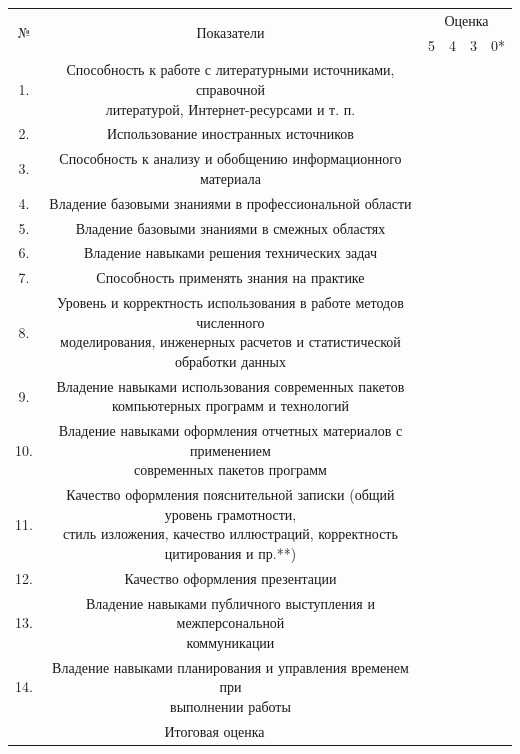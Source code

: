 \documentclass[12pt]{article}
\begin{document}
\noindent 
\begin{center}
\begin{table}[h!]
\hspace*{-0.75cm}
\begin{tabular}{|c|c|c|c|c|c|}
\hline
	\multirow{2}{*}{№}	&	\multirow{2}{*}{Показатели}	& \multicolumn{4}{c|}{Оценка} \\
\hhline{~~----}
 					&							&	5	&  4  & 3 & 0*  \\
\hline
 	1.				&	\makecell{Способность к работе с литературными источниками, справочной\\ литературой, Интернет-ресурсами и т. п.}	&  & & &  \\
 	\hline
 	2.				&	Использование иностранных источников	&  & & &  \\
 	\hline
 	3.				&	Способность к анализу и обобщению информационного материала	&  & & &  \\
 	\hline
 	4.				&	Владение базовыми знаниями в профессиональной области	&  & & &  \\
 	\hline
 	5.				&	Владение базовыми знаниями в смежных областях	&  & & &  \\
 	\hline
 	6.				&	Владение навыками решения технических задач	&  & & &  \\
 	\hline
 	7.				&	Способность применять знания на практике	&  & & &  \\
 	\hline
 	8.				&	\makecell{Уровень и корректность использования в работе методов численного\\ моделирования, инженерных расчетов и статистической обработки данных}	&  & & &  \\
 	\hline
 	9.				&	\makecell{Владение навыками использования современных пакетов\\ компьютерных программ и технологий}	&  & & &  \\
 	\hline
 	10.				&	\makecell{Владение навыками оформления отчетных материалов с применением\\ современных пакетов программ}	&  & & &  \\
 	\hline
 	11.				&	\makecell{Качество оформления пояснительной записки (общий уровень грамотности,\\ стиль изложения, качество иллюстраций, корректность цитирования и пр.**)}	&  & & &  \\
 	\hline
 	12.				&	Качество оформления презентации	&  & & &  \\
 	\hline
 	13.				&	\makecell{Владение навыками публичного выступления и межперсональной\\ коммуникации}	&  & & &  \\
 	\hline
 	14.				&	\makecell{Владение навыками планирования и управления временем при\\ выполнении работы}	&  & & &  \\
 	\hline
 \multicolumn{2}{|c|}{Итоговая оценка} &  \multicolumn{4}{c|}{ } \\
\hline
\end{tabular}
\hspace*{-0.75cm}
\end{table}
\end{center}
\end{document}
